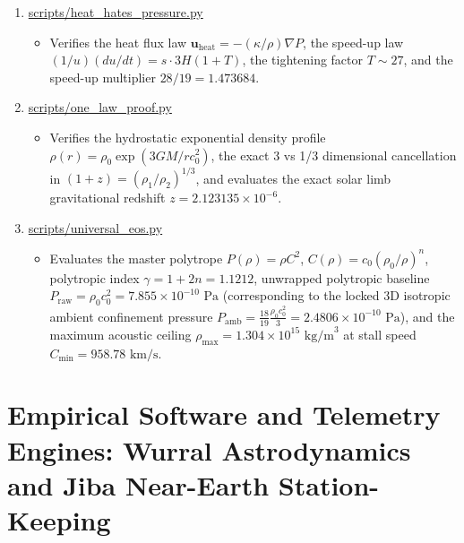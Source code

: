 \documentclass[11pt,a4paper]{article}
\begin{document}
\begin{enumerate}
    \item \url{scripts/heat_hates_pressure.py}
    \begin{itemize}
        \item Verifies the heat flux law $\mathbf{u}_{\text{heat}} = -(\kappa/\rho)\nabla P$, the speed-up law $(1/u)(du/dt) = s \cdot 3H(1+T)$, the tightening factor $T \sim 27$, and the speed-up multiplier $28/19 = 1.473684$.
    \end{itemize}

    \item \url{scripts/one_law_proof.py}
    \begin{itemize}
        \item Verifies the hydrostatic exponential density profile $\rho(r) = \rho_0 \exp(3GM/rc_0^2)$, the exact 3 vs 1/3 dimensional cancellation in $(1+z) = (\rho_1/\rho_2)^{1/3}$, and evaluates the exact solar limb gravitational redshift $z = 2.123135 \times 10^{-6}$.
    \end{itemize}

    \item \url{scripts/universal_eos.py}
    \begin{itemize}
        \item Evaluates the master polytrope $P(\rho) = \rho C^2$, $C(\rho) = c_0(\rho_0/\rho)^n$, polytropic index $\gamma = 1 + 2n = 1.1212$, unwrapped polytropic baseline $P_{\text{raw}} = \rho_0 c_0^2 = 7.855 \times 10^{-10}\text{ Pa}$ (corresponding to the locked 3D isotropic ambient confinement pressure $P_{\text{amb}} = \frac{18}{19}\frac{\rho_0 c_0^2}{3} = 2.4806 \times 10^{-10}\text{ Pa}$), and the maximum acoustic ceiling $\rho_{\max} = 1.304 \times 10^{15}\text{ kg/m}^3$ at stall speed $C_{\min} = 958.78\text{ km/s}$.
    \end{itemize}
\end{enumerate}


\section{Empirical Software and Telemetry Engines: Wurral Astrodynamics and Jiba Near-Earth Station-Keeping}
\label{sec:software_telemetry_engines}
\end{document}
